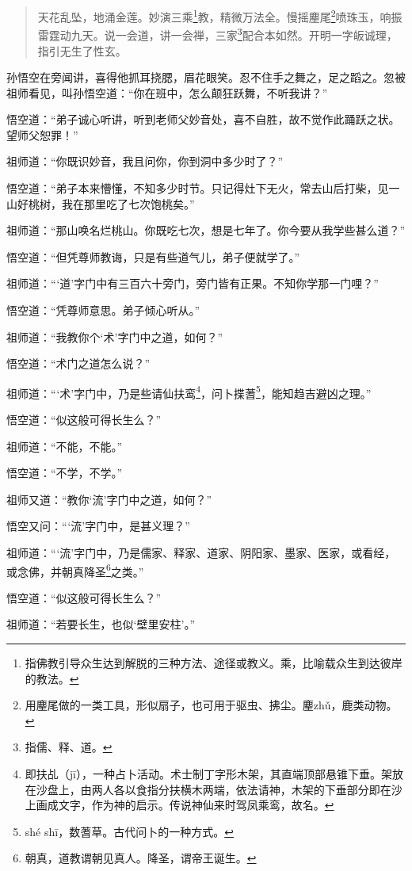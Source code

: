 \documentclass[12pt,UTF8]{ctexbook}
\begin{document}
\begin{quotation}
天花乱坠，地涌金莲。妙演三乘\footnote{指佛教引导众生达到解脱的三种方法、途径或教义。乘，比喻载众生到达彼岸的教法。}教，精微万法全。慢摇麈尾\footnote{用麈尾做的一类工具，形似扇子，也可用于驱虫、拂尘。麈zh\v{u}，鹿类动物。}喷珠玉，响振雷霆动九天。说一会道，讲一会禅，三家\footnote{指儒、释、道。}配合本如然。开明一字皈诚理，指引无生了性玄。
\end{quotation}

孙悟空在旁闻讲，喜得他抓耳挠腮，眉花眼笑。忍不住手之舞之，足之蹈之。忽被祖师看见，叫孙悟空道：“你在班中，怎么颠狂跃舞，不听我讲？”

悟空道：“弟子诚心听讲，听到老师父妙音处，喜不自胜，故不觉作此踊跃之状。望师父恕罪！”

祖师道：“你既识妙音，我且问你，你到洞中多少时了？”

悟空道：“弟子本来懵懂，不知多少时节。只记得灶下无火，常去山后打柴，见一山好桃树，我在那里吃了七次饱桃矣。”

祖师道：“那山唤名烂桃山。你既吃七次，想是七年了。你今要从我学些甚么道？”

悟空道：“但凭尊师教诲，只是有些道气儿，弟子便就学了。”

祖师道：“‘道’字门中有三百六十旁门，旁门皆有正果。不知你学那一门哩？”

悟空道：“凭尊师意思。弟子倾心听从。”

祖师道：“我教你个‘术’字门中之道，如何？”

悟空道：“术门之道怎么说？”

祖师道：“‘术’字门中，乃是些请仙扶鸾\footnote{即扶乩（j\=i），一种占卜活动。术士制丁字形木架，其直端顶部悬锥下垂。架放在沙盘上，由两人各以食指分扶横木两端，依法请神，木架的下垂部分即在沙上画成文字，作为神的启示。传说神仙来时驾凤乘鸾，故名。}，问卜揲蓍\footnote{sh\'e sh\=i，数蓍草。古代问卜的一种方式。}，能知趋吉避凶之理。”

悟空道：“似这般可得长生么？”

祖师道：“不能，不能。”

悟空道：“不学，不学。”

祖师又道：“教你‘流’字门中之道，如何？”

悟空又问：“‘流’字门中，是甚义理？”

祖师道：“‘流’字门中，乃是儒家、释家、道家、阴阳家、墨家、医家，或看经，或念佛，并朝真降圣\footnote{朝真，道教谓朝见真人。降圣，谓帝王诞生。}之类。”

悟空道：“似这般可得长生么？”

祖师道：“若要长生，也似‘壁里安柱’。”
\end{document}
